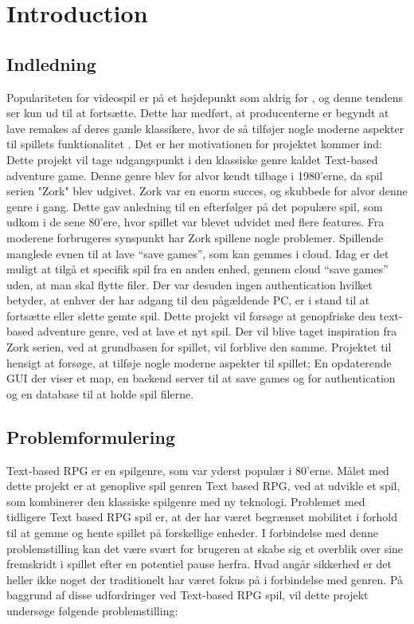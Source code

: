 \section{Introduction}
\subsection{Indledning}

Populariteten for videospil er på et højdepunkt som aldrig før \cite{WE-PC}, og denne tendens ser kun ud til at fortsætte. Dette har medført, at producenterne er begyndt at lave remakes af deres gamle klassikere, hvor de så tilføjer nogle moderne aspekter til spillets funktionalitet \cite{Protocol}. Det er her motivationen for projektet kommer ind: \\

Dette projekt vil tage udgangspunkt i den klassiske genre kaldet Text-based adventure game. Denne genre blev for alvor kendt tilbage i 1980'erne, da spil serien "Zork" blev udgivet. Zork var en enorm succes\cite{WikiZork}, og skubbede for alvor denne genre i gang. 
Dette gav anledning til en efterfølger på det populære spil, som udkom i de sene 80’ere, hvor spillet var blevet udvidet med flere features.
Fra moderene forbrugeres synspunkt har Zork spillene nogle problemer. Spillende manglede evnen til at lave ``save games'', som kan gemmes i cloud. 
Idag er det muligt at tilgå et specifik spil fra en anden enhed, gennem cloud ``save games'' uden, at man skal flytte filer. Der var desuden ingen 
authentication hvilket betyder, at enhver der har adgang til den pågældende PC, er i stand til at fortsætte eller slette gemte spil. 
Dette projekt vil forsøge at genopfriske den text-based adventure genre, ved at lave et nyt spil. Der vil blive taget inspiration 
fra Zork serien, ved at grundbasen for spillet, vil forblive den samme. Projektet til hensigt at forsøge, at tilføje nogle moderne aspekter til spillet;
En opdaterende GUI der viser et map, en backend server til at save games og for authentication og en database til at holde spil filerne.

\subsection{Problemformulering}
Text-based RPG er en spilgenre, som var yderst populær i 80’erne. Målet med dette projekt er at genoplive spil genren Text based RPG, ved at udvikle et spil, 
som kombinerer den klassiske spilgenre med ny teknologi. Problemet med tidligere Text based RPG spil er, at der har været begrænset mobilitet i forhold 
til at gemme og hente spillet på forskellige enheder. I forbindelse med denne problemstilling kan det være svært for brugeren at skabe sig et overblik over
sine fremskridt i spillet efter en potentiel pause herfra. Hvad angår sikkerhed er det heller ikke noget der traditionelt har været fokus på i forbindelse med genren. 
På baggrund af disse udfordringer ved Text-based RPG spil, vil dette projekt undersøge følgende problemstilling: \\

